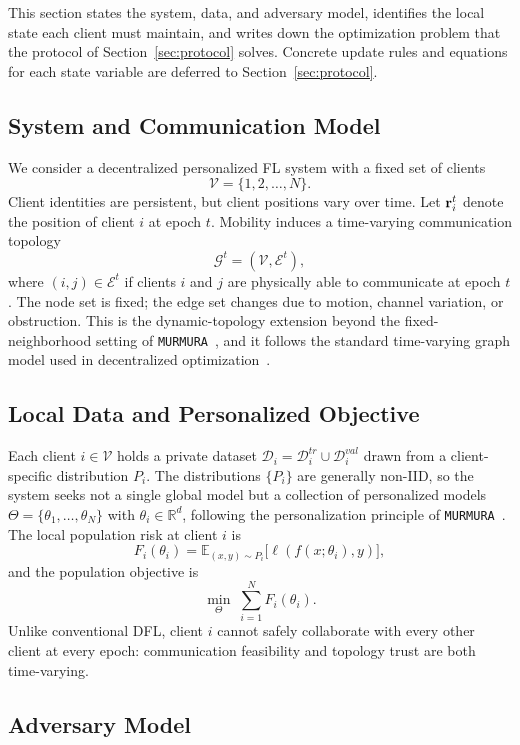 \documentclass[journal]{IEEEtran}
\theoremstyle{definition}
\theoremstyle{remark}
\begin{document}
This section states the system, data, and adversary model, identifies the local state each client must maintain, and writes down the optimization problem that the protocol of Section~\ref{sec:protocol} solves. Concrete update rules and equations for each state variable are deferred to Section~\ref{sec:protocol}.

\subsection{System and Communication Model}

We consider a decentralized personalized FL system with a fixed set of clients
$$
\mathcal V = \{1,2,\dots,N\}.
$$
Client identities are persistent, but client positions vary over time. Let ${\bf r}_i^t$ denote the position of client $i$ at epoch $t$. Mobility induces a time-varying communication topology
$$
\mathcal G^t = (\mathcal V,\mathcal E^t),
$$
where $(i,j)\in\mathcal E^t$ if clients $i$ and $j$ are physically able to communicate at epoch $t$. The node set is fixed; the edge set changes due to motion, channel variation, or obstruction. This is the dynamic-topology extension beyond the fixed-neighborhood setting of \texttt{MURMURA}~\cite{rangwala2025evidential}, and it follows the standard time-varying graph model used in decentralized optimization~\cite{ye2022decentralized,wu2024topology}.

\subsection{Local Data and Personalized Objective}

Each client $i\in\mathcal V$ holds a private dataset $\mathcal D_i = \mathcal D_i^{tr} \cup \mathcal D_i^{val}$ drawn from a client-specific distribution $P_i$. The distributions $\{P_i\}$ are generally non-IID, so the system seeks not a single global model but a collection of personalized models $\Theta = \{\theta_1,\dots,\theta_N\}$ with $\theta_i\in\mathbb R^d$, following the personalization principle of \texttt{MURMURA}~\cite{rangwala2025evidential}. The local population risk at client $i$ is
$$
F_i(\theta_i) = \mathbb E_{(x,y)\sim P_i}\big[\ell(f(x;\theta_i),y)\big],
$$
and the population objective is
$$
\min_{\Theta}\; \sum_{i=1}^{N} F_i(\theta_i).
$$
Unlike conventional DFL, client $i$ cannot safely collaborate with every other client at every epoch: communication feasibility and topology trust are both time-varying.

\subsection{Adversary Model}
\label{sec:adversary}
\end{document}
